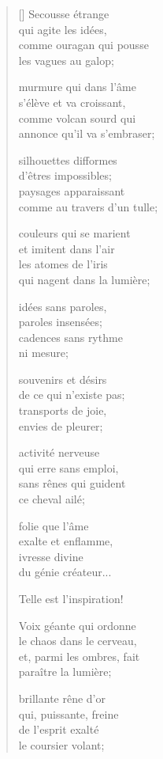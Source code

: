 \documentclass[a4paper,12pt]{book}
\begin{document}
\begin{verse}[\versewidth]
  Secousse étrange \\
  qui agite les idées, \\
  comme ouragan qui pousse \\
  les vagues au galop;

  murmure qui dans l'âme \\
  s'élève et va croissant, \\
  comme volcan sourd qui \\
  annonce qu'il va s'embraser;

  silhouettes difformes \\
  d'êtres impossibles; \\
  paysages apparaissant \\
  comme au travers d'un tulle;

  couleurs qui se marient \\
  et imitent dans l'air \\
  les atomes de l'iris \\
  qui nagent dans la lumière;

  idées sans paroles, \\
  paroles insensées; \\
  cadences sans rythme \\
  ni mesure;

  souvenirs et désirs \\
  de ce qui n'existe pas; \\
  transports de joie, \\
  envies de pleurer;

  activité nerveuse \\
  qui erre sans emploi, \\
  sans rênes qui guident \\
  ce cheval ailé;

  folie que l'âme \\
  exalte et enflamme, \\
  ivresse divine \\
  du génie créateur...

  Telle est l'inspiration!

  Voix géante qui ordonne \\
  le chaos dans le cerveau, \\
  et, parmi les ombres, fait \\
  paraître la lumière;

  brillante rêne d'or \\
  qui, puissante, freine \\
  de l'esprit exalté \\
  le coursier volant;


\end{verse}
\end{document}
